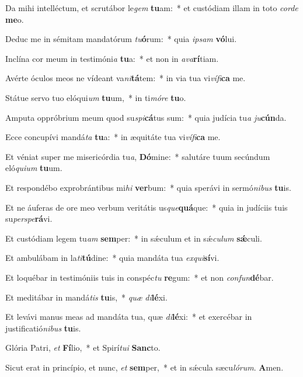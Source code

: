 ﻿\item Da mihi intelléctum, et scrutábor le\emph{gem} \textbf{tu}am:~* et custódiam illam in toto \emph{cor}\emph{de} \textbf{me}o.
\item Deduc me in sémitam mandatórum \emph{tu}\textbf{ó}rum:~* quia \emph{ip}\emph{sam} \textbf{vó}lui.
\item Inclína cor meum in testimóni\emph{a} \textbf{tu}a:~* et non in \emph{a}\emph{va}\textbf{rí}tiam.
\item Avérte óculos meos ne vídeant va\emph{ni}\textbf{tá}tem:~* in via tua vi\emph{ví}\emph{fi}\textbf{ca} me.
\item Státue servo tuo elóqui\emph{um} \textbf{tu}um,~* in ti\emph{mó}\emph{re} \textbf{tu}o.
\item Amputa oppróbrium meum quod su\emph{spi}\textbf{cá}tus sum:~* quia judícia tu\emph{a} \emph{ju}\textbf{cún}da.
\item Ecce concupívi mandá\emph{ta} \textbf{tu}a:~* in æquitáte tua vi\emph{ví}\emph{fi}\textbf{ca} me.
\item Et véniat super me misericórdia tu\emph{a}, \textbf{Dó}mine:~* salutáre tuum secúndum eló\emph{qui}\emph{um} \textbf{tu}um.
\item Et respondébo exprobrántibus mi\emph{hi} \textbf{ver}bum:~* quia sperávi in sermó\emph{ni}\emph{bus} \textbf{tu}is.
\item Et ne áuferas de ore meo verbum veritátis us\emph{que}\textbf{quá}que:~* quia in judíciis tuis su\emph{per}\emph{spe}\textbf{rá}vi.
\item Et custódiam legem tu\emph{am} \textbf{sem}per:~* in sǽculum et in sǽ\emph{cu}\emph{lum} \textbf{sǽ}culi.
\item Et ambulábam in la\emph{ti}\textbf{tú}dine:~* quia mandáta tua \emph{ex}\emph{qui}\textbf{sí}vi.
\item Et loquébar in testimóniis tuis in conspéc\emph{tu} \textbf{re}gum:~* et non \emph{con}\emph{fun}\textbf{dé}bar.
\item Et meditábar in mandá\emph{tis} \textbf{tu}is,~* \emph{quæ} \emph{di}\textbf{lé}xi.
\item Et levávi manus meas ad mandáta tua, quæ \emph{di}\textbf{lé}xi:~* et exercébar in justificatió\emph{ni}\emph{bus} \textbf{tu}is.
\item Glória Patri, \emph{et} \textbf{Fí}lio,~* et Spirí\emph{tu}\emph{i} \textbf{Sanc}to.
\item Sicut erat in princípio, et nunc, \emph{et} \textbf{sem}per,~* et in sǽcula sæcu\emph{ló}\emph{rum}. \textbf{A}men.